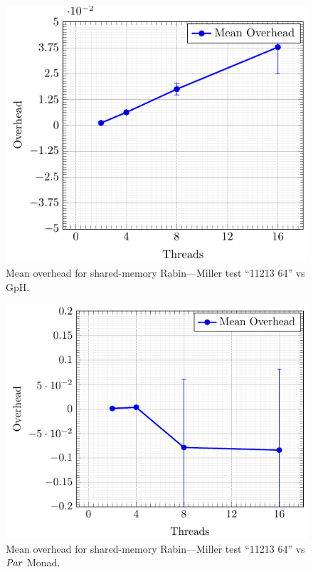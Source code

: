 \documentclass[paper=A4,twoside=true,openright,parskip=full,chapterprefix=true,headings=normal,bibliography=totoc,listof=totoc,titlepage=on,captions=tableabove,draft=false,british]{scrreprt}%
\renewcommand{\enquote}[1]{{``}#1{''}}
\begin{document}
\begin{figure}[h]
\centering
\includegraphics{src/img/overSMRM64GpH.pdf}
\caption{Mean overhead for shared-memory Rabin---Miller test
\enquote{11213 64} vs GpH.\label{fig:overSMRM64GpH}}
\end{figure}

\begin{figure}[h]
\centering
\includegraphics{src/img/overSMRM64Par.pdf}
\caption{Mean overhead for shared-memory Rabin---Miller test
\enquote{11213 64} vs \ensuremath{\Conid{Par}} Monad.\label{fig:overSMRM64Par}}
\end{figure}
\end{document}

